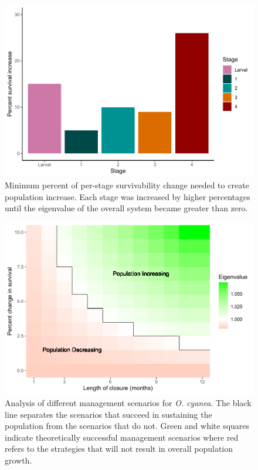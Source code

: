 \documentclass[
]{article}
\begin{document}
\begin{figure}
\centering
\includegraphics{Wulfing_Thesis_files/figure-latex/stages-1.pdf}
\caption{\label{fig:stages}Minimum percent of per-stage survivability change needed to create population increase. Each stage was increased by higher percentages until the eigenvalue of the overall system became greater than zero. \label{stages}}
\end{figure}



\begin{figure}
\centering
\includegraphics{Wulfing_Thesis_files/figure-latex/closures-1.pdf}
\caption{\label{fig:closures}Analysis of different management scenarios for \emph{O. cyanea}. The black line separates the scenarios that succeed in sustaining the population from the scenarios that do not. Green and white squares indicate theoretically successful management scenarios where red refers to the strategies that will not result in overall population growth. \label{closures}}
\end{figure}
\end{document}
